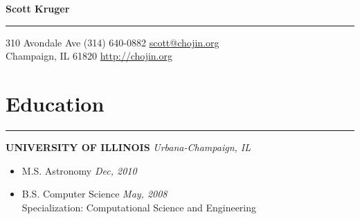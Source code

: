 \documentclass[a4paper,11pt]{article}
\begin{document}
\Huge{\textbf{Scott Kruger}}
\hrule
\vspace{0.05in}
\normalsize{310 Avondale Ave \hfill (314) 640-0882 \hfill \href{mailto:scott@chojin.org}{scott@chojin.org} \\
Champaign, IL 61820 \hfill \href{http://chojin.org}{http://chojin.org}}

\section*{\huge{Education}}
\hrule
\vspace{0.1in}
\textbf{UNIVERSITY OF ILLINOIS} \hfill \textit{Urbana-Champaign, IL}
\begin{itemize}
\setlength{\itemsep}{0.1in}
\item[]M.S. Astronomy \hfill \textit{Dec, 2010}
\item[]B.S. Computer Science \hfill \textit{May, 2008} \\
Specialization: Computational Science and Engineering
\end{itemize}
\end{document}
